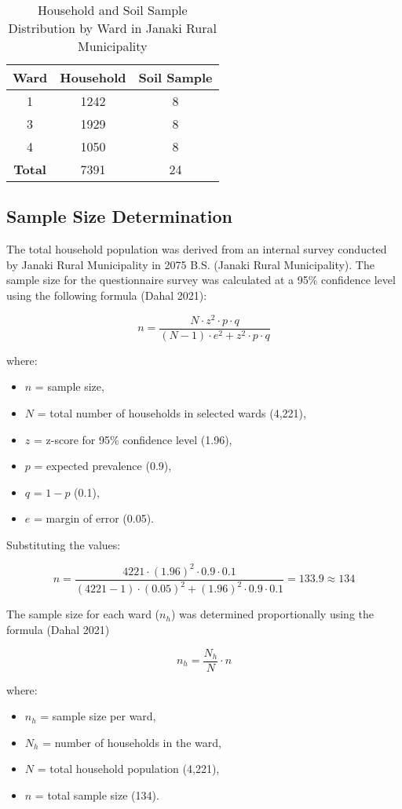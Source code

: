 \begin{table}[h]
\centering
\caption{Household and Soil Sample Distribution by Ward in Janaki Rural Municipality}
\label{tab:household_distribution}

\begin{tabular}{|c|c|c|}
\hline
\textbf{Ward} & \textbf{Household} & \textbf{Soil Sample} \\ \hline
1 & 1242 & 8 \\ \hline
3 & 1929 & 8 \\ \hline
4 & 1050 & 8 \\ \hline
\textbf{Total} & 7391 & 24 \\ \hline
\end{tabular}
\end{table}

\subsection{Sample Size Determination}  
The total household population was derived from an internal survey conducted by Janaki Rural Municipality in 2075 B.S. (Janaki Rural Municipality). The sample size for the questionnaire survey was calculated at a 95\% confidence level using the following formula (Dahal 2021):

\[
n = \frac{N \cdot z^2 \cdot p \cdot q}{(N - 1) \cdot e^2 + z^2 \cdot p \cdot q}
\]

where:
\begin{itemize}
    \item $n$ = sample size,
    \item $N$ = total number of households in selected wards (4,221),
    \item $z$ = z-score for 95\% confidence level (1.96),
    \item $p$ = expected prevalence (0.9),
    \item $q$ = $1 - p$ (0.1),
    \item $e$ = margin of error (0.05).
\end{itemize}

Substituting the values:

\[
n = \frac{4221 \cdot (1.96)^2 \cdot 0.9 \cdot 0.1}{(4221 - 1) \cdot (0.05)^2 + (1.96)^2 \cdot 0.9 \cdot 0.1} = 133.9 \approx 134
\]

The sample size for each ward ($n_h$) was determined proportionally using the formula (Dahal 2021)

\[
n_h = \frac{N_h}{N} \cdot n
\]

where:
\begin{itemize}
    \item $n_h$ = sample size per ward,
    \item $N_h$ = number of households in the ward,
    \item $N$ = total household population (4,221),
    \item $n$ = total sample size (134).
\end{itemize}

